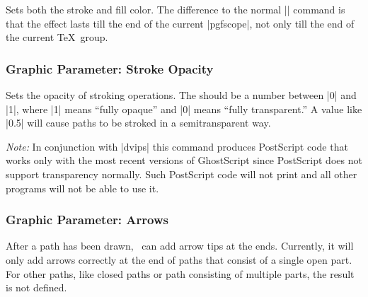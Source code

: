 \begin{command}{\pgfsetcolor{}}
  Sets both the stroke and fill color. The difference to the normal
  |\color| command is that the effect lasts till the end of the
  current |{pgfscope}|, not only till the end of the current \TeX\
  group. 
\end{command}


\subsubsection{Graphic Parameter: Stroke Opacity}

\begin{command}{\pgfsetstrokeopacity{}}
  Sets the opacity of stroking operations. The  should be
  a number between |0| and |1|, where |1| means ``fully opaque'' and
  |0| means ``fully transparent.'' A value like |0.5| will cause paths
  to be stroked in a semitransparent way.

  \emph{Note:} In conjunction with |dvips| this command produces
  PostScript code that works only with the most recent versions of
  GhostScript  since PostScript does not support transparency
  normally. Such PostScript code will not print and all other programs
  will not be able to use it.
  
\begin{codeexample}[]
\begin{pgfpicture}
  \pgfsetlinewidth{5mm}
  \color{red}
  \pgfpathcircle{\pgfpoint{0cm}{0cm}}{10mm} 
  \color{black}
  \pgfpathcircle{\pgfpoint{1cm}{0cm}}{10mm} 
\end{pgfpicture}
\end{codeexample}
\end{command}


\subsubsection{Graphic Parameter: Arrows}

After a path has been drawn, \pgfname\ can add arrow tips at the
ends. Currently, it will only add arrows correctly at the end of paths
that consist of a single open part. For other paths, like closed paths
or path consisting of multiple parts, the result is not defined.

